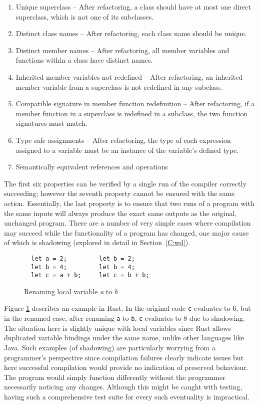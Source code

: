\begin{enumerate}
\item Unique superclass -- After refactoring, a class should have at most one direct superclass, which is not one of its subclasses.
\item Distinct class names -- After refactoring, each class name should be unique.
\item Distinct member names --  After refactoring, all member variables and functions within a class have distinct names.
\item Inherited member variables not redefined -- After refactoring, an inherited member variable from a superclass is not redefined in any subclass.
\item Compatible signature in member function redefinition -- After refactoring, if a member function in a superclass is redefined in a subclass, the two function signatures must match.
\item Type safe assignments -- After refactoring, the type of each expression assigned to a variable must be an instance of the variable's defined type.
\item Semantically equivalent references and operations
\end{enumerate}

The first six properties can be verified by a single run of the compiler correctly succeeding; however the seventh property cannot be ensured with the same action. Essentially, the last property is to ensure that two runs of a program with the same inputs will always produce the exact same outputs as the original, unchanged program. There are a number of very simple cases where compilation may succeed while the functionality of a program has changed, one major cause of which is shadowing (explored in detail in Section~\ref{C:wd}). 

\begin{figure}
\begin{verbatim}
  let a = 2;         let b = 2;
  let b = 4;         let b = 4;
  let c = a + b;     let c = b + b;
\end{verbatim}
\caption{Renaming local variable \emph{a} to \emph{b}}
\label{Fig:opdyke}
\end{figure}

Figure \ref{Fig:opdyke} describes an example in Rust. In the original code {\verb|c|} evaluates to 6, but in the renamed case, after renaming {\verb|a|} to {\verb|b|}, {\verb|c|} evaluates to 8 due to shadowing. The situation here is slightly unique with local variables since Rust allows duplicated variable bindings under the same name, unlike other languages like Java. Such examples (of shadowing) are particularly worrying from a programmer's perspective since compilation failures clearly indicate issues but here successful compilation would provide no indication of preserved behaviour. The program would simply function differently without the programmer necessarily noticing any changes. Although this might be caught with testing, having such a comprehensive test suite for every such eventuality is impractical.

